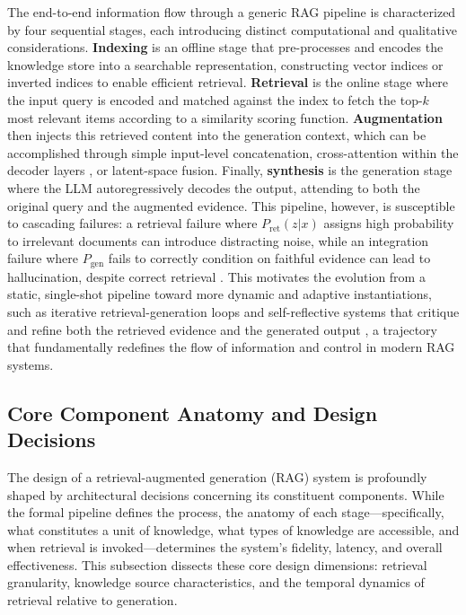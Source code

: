 \documentclass[11pt,a4paper]{article}
\begin{document}
The end-to-end information flow through a generic RAG pipeline is characterized by four sequential stages, each introducing distinct computational and qualitative considerations. \textbf{Indexing} is an offline stage that pre-processes and encodes the knowledge store into a searchable representation, constructing vector indices or inverted indices to enable efficient retrieval. \textbf{Retrieval} is the online stage where the input query is encoded and matched against the index to fetch the top-\( k \) most relevant items according to a similarity scoring function. \textbf{Augmentation} then injects this retrieved content into the generation context, which can be accomplished through simple input-level concatenation, cross-attention within the decoder layers \cite{arxiv:2112.04426v3}, or latent-space fusion. Finally, \textbf{synthesis} is the generation stage where the LLM autoregressively decodes the output, attending to both the original query and the augmented evidence. This pipeline, however, is susceptible to cascading failures: a retrieval failure where \( P_{\text{ret}}(z|x) \) assigns high probability to irrelevant documents can introduce distracting noise, while an integration failure where \( P_{\text{gen}} \) fails to correctly condition on faithful evidence can lead to hallucination, despite correct retrieval \cite{arxiv:2310.01558v1,arxiv:2401.05856v1}. This motivates the evolution from a static, single-shot pipeline toward more dynamic and adaptive instantiations, such as iterative retrieval-generation loops \cite{arxiv:2305.06983v2} and self-reflective systems that critique and refine both the retrieved evidence and the generated output \cite{arxiv:2310.11511v1}, a trajectory that fundamentally redefines the flow of information and control in modern RAG systems.


\subsection{Core Component Anatomy and Design Decisions}


The design of a retrieval-augmented generation (RAG) system is profoundly shaped by architectural decisions concerning its constituent components. While the formal pipeline defines the process, the anatomy of each stage---specifically, what constitutes a unit of knowledge, what types of knowledge are accessible, and when retrieval is invoked---determines the system's fidelity, latency, and overall effectiveness. This subsection dissects these core design dimensions: retrieval granularity, knowledge source characteristics, and the temporal dynamics of retrieval relative to generation.
\end{document}
